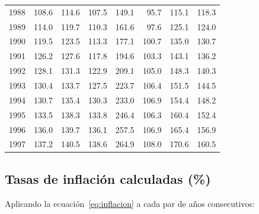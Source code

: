 \documentclass[12pt, letterpaper]{article}
\theoremstyle{remark}
\begin{document}
\begin{datebox}
\begin{tabular}{crrrrrrr}
1988 & 108.6 & 114.6 & 107.5 & 149.1 & 95.7 & 115.1 & 118.3 \\
1989 & 114.0 & 119.7 & 110.3 & 161.6 & 97.6 & 125.1 & 124.0 \\
1990 & 119.5 & 123.5 & 113.3 & 177.1 & 100.7 & 135.0 & 130.7 \\
1991 & 126.2 & 127.6 & 117.8 & 194.6 & 103.3 & 143.1 & 136.2 \\
1992 & 128.1 & 131.3 & 122.9 & 209.1 & 105.0 & 148.3 & 140.3 \\
1993 & 130.4 & 133.7 & 127.5 & 223.7 & 106.4 & 151.5 & 144.5 \\
1994 & 130.7 & 135.4 & 130.3 & 233.0 & 106.9 & 154.4 & 148.2 \\
1995 & 133.5 & 138.3 & 133.8 & 246.4 & 106.3 & 160.4 & 152.4 \\
1996 & 136.0 & 139.7 & 136.1 & 257.5 & 106.9 & 165.4 & 156.9 \\
1997 & 137.2 & 140.5 & 138.6 & 264.9 & 108.0 & 170.6 & 160.5 \\
\bottomrule
\end{tabular}
\end{datebox}

\subsection{Tasas de inflaci\'on calculadas (\%)}

Aplicando la ecuaci\'on~\eqref{eq:inflacion} a cada par de a\~nos consecutivos:
\end{document}
